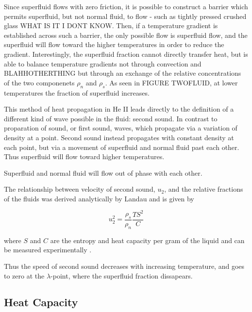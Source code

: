 Since superfluid flows with zero friction, it is possible to construct
a barrier which permits superfluid, but not normal fluid, to flow -
such as tightly pressed crushed glass WHAT IS IT I DONT KNOW. Then, if
a temperature gradient is established across such a barrier, the only
possible flow is superfluid flow, and the superfluid will flow toward
the higher temperatures in order to reduce the
gradient. Interestingly, the superfluid fraction cannot directly
transfer heat, but is able to balance temperature gradients not
through convection and BLAHHOTHERTHING but through an exchange of the
relative concentrations of the two componenets $\rho_n$ and
$\rho_s$. As seen in FIGURE TWOFLUID, at lower temperatures the
fraction of superfluid increases.

This method of heat propagation in He II leads directly to the
definition of a different kind of wave possible in the fluid: second
sound. In contrast to proparation of sound, or first sound, waves,
which propagate via a variation of density at a point. Second sound
instead propagates with constant density at each point, but via a
movement of superfluid and normal fluid past each other. Thus
superfluid will flow toward higher temperatures.

Superfluid and normal fluid will flow out of phase with each other. 

The relationship between velocity of second sound, $u_2$, and the
relative fractions of the fluids was derived analytically by Landau
and is given by

\begin{equation}
u_2^2 = \frac{\rho_s}{\rho_n}\frac{T S^2}{C}
\end{equation}

where $S$ and $C$ are the entropy and heat capacity per gram of the
liquid and can be measured experimentally \cite{atkins}. 

Thus the speed of second sound decreases with increasing temperature,
and goes to zero at the $\lambda$-point, where the superfluid fraction
dissapears.

\subsection{Heat Capacity}
